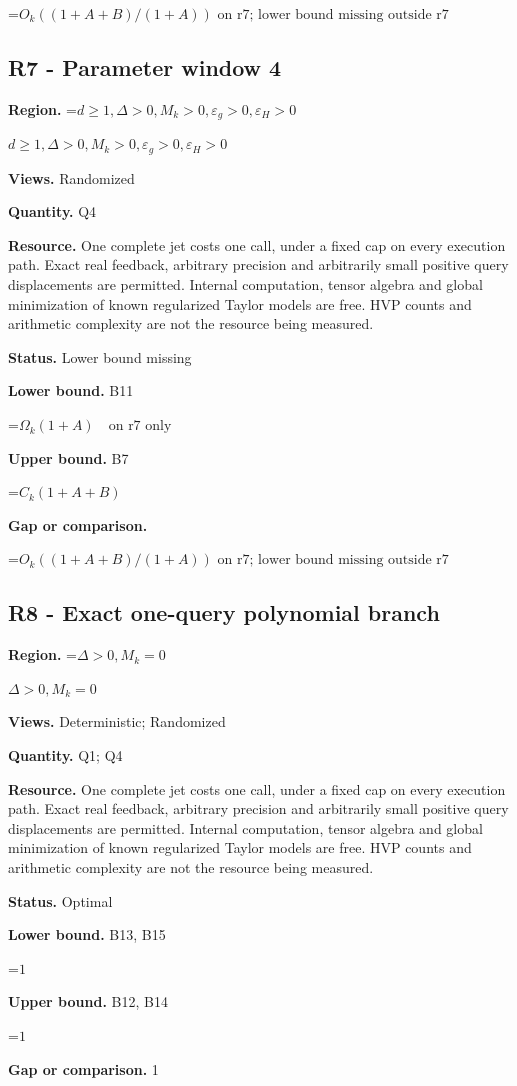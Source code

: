 \documentclass[10pt,a4paper]{article}
\newcommand{\AtlasMath}[1]{\par\begingroup\centering\setbox0=\hbox{$\displaystyle #1$}\ifdim\wd0>1.4\linewidth\typeout{ATLAS WIDE FORMULA: \the\wd0}\fi\ifdim\wd0>\linewidth\resizebox{\linewidth}{!}{\box0}\else\box0\fi\par\endgroup}
\newcommand{\AtlasInlineMath}[1]{\begingroup\setbox0=\hbox{$#1$}\ifdim\wd0>.4\linewidth\endgroup\AtlasMath{#1}\else\endgroup$#1$\fi}
\begin{document}
\AtlasMath{O_k((1+A+B)/(1+A))\text{ on r7; lower bound missing outside r7}}
\subsection{R7 - Parameter window 4}
\textbf{Region.} \AtlasInlineMath{d\ge 1,\Delta>0,M_k>0,\varepsilon_g>0,\varepsilon_H>0}

\textbf{Views.} Randomized

\textbf{Quantity.} Q4

\textbf{Resource.} One complete jet costs one call, under a fixed cap on every execution path. Exact real feedback, arbitrary precision and arbitrarily small positive query displacements are permitted. Internal computation, tensor algebra and global minimization of known regularized Taylor models are free. HVP counts and arithmetic complexity are not the resource being measured.

\textbf{Status.} Lower bound missing

\textbf{Lower bound.} B11

\AtlasMath{\Omega_k(1+A)\quad\text{on r7 only}}
\textbf{Upper bound.} B7

\AtlasMath{C_k(1+A+B)}
\textbf{Gap or comparison.}

\AtlasMath{O_k((1+A+B)/(1+A))\text{ on r7; lower bound missing outside r7}}
\subsection{R8 - Exact one-query polynomial branch}
\textbf{Region.} \AtlasInlineMath{\Delta>0,M_k=0}

\textbf{Views.} Deterministic; Randomized

\textbf{Quantity.} Q1; Q4

\textbf{Resource.} One complete jet costs one call, under a fixed cap on every execution path. Exact real feedback, arbitrary precision and arbitrarily small positive query displacements are permitted. Internal computation, tensor algebra and global minimization of known regularized Taylor models are free. HVP counts and arithmetic complexity are not the resource being measured.

\textbf{Status.} Optimal

\textbf{Lower bound.} B13, B15

\AtlasMath{1}
\textbf{Upper bound.} B12, B14

\AtlasMath{1}
\textbf{Gap or comparison.} 1
\end{document}
